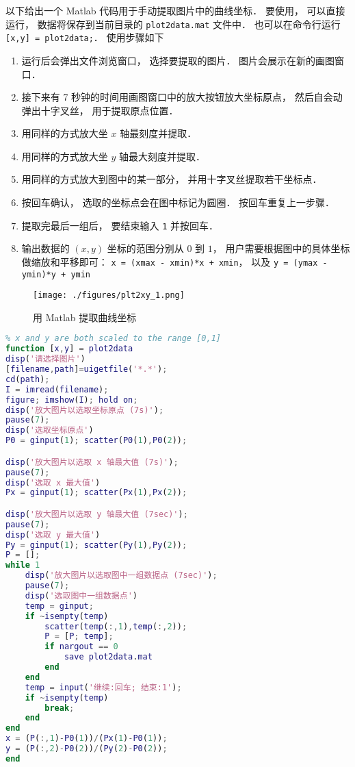 

以下给出一个 Matlab 代码用于手动提取图片中的曲线坐标． 要使用， 可以直接运行， 数据将保存到当前目录的 \verb|plot2data.mat| 文件中． 也可以在命令行运行 \verb|[x,y] = plot2data;|． 使用步骤如下

\begin{enumerate}
\item 运行后会弹出文件浏览窗口， 选择要提取的图片． 图片会展示在新的画图窗口．
\item 接下来有 7 秒钟的时间用画图窗口中的放大按钮放大坐标原点， 然后自会动弹出十字叉丝， 用于提取原点位置．
\item 用同样的方式放大坐 $x$ 轴最刻度并提取．
\item 用同样的方式放大坐 $y$ 轴最大刻度并提取．
\item 用同样的方式放大到图中的某一部分， 并用十字叉丝提取若干坐标点．
\item 按回车确认， 选取的坐标点会在图中标记为圆圈． 按回车重复上一步骤．
\item 提取完最后一组后， 要结束输入 \verb|1| 并按回车．
\item 输出数据的 $(x, y)$ 坐标的范围分别从 $0$ 到 $1$， 用户需要根据图中的具体坐标做缩放和平移即可： \verb|x = (xmax - xmin)*x + xmin|， 以及 \verb|y = (ymax - ymin)*y + ymin|
\end{enumerate}

\begin{figure}[ht]
\centering
\texttt{[image: ./figures/plt2xy\_1.png]}
\caption{用 Matlab 提取曲线坐标} \label{plt2xy_fig1}
\end{figure}

\begin{lstlisting}[language=matlab, caption=plot2data.m]
% Data Extractor for Plot
% x and y are both scaled to the range [0,1]
function [x,y] = plot2data
disp('请选择图片')
[filename,path]=uigetfile('*.*');
cd(path);
I = imread(filename);
figure; imshow(I); hold on;
disp('放大图片以选取坐标原点 (7s)');
pause(7);
disp('选取坐标原点')
P0 = ginput(1); scatter(P0(1),P0(2));

disp('放大图片以选取 x 轴最大值 (7s)');
pause(7);
disp('选取 x 最大值')
Px = ginput(1); scatter(Px(1),Px(2));

disp('放大图片以选取 y 轴最大值 (7sec)');
pause(7);
disp('选取 y 最大值')
Py = ginput(1); scatter(Py(1),Py(2));
P = [];
while 1
    disp('放大图片以选取图中一组数据点 (7sec)');
    pause(7);
    disp('选取图中一组数据点')
    temp = ginput;
    if ~isempty(temp)
        scatter(temp(:,1),temp(:,2));
        P = [P; temp];
        if nargout == 0
            save plot2data.mat
        end
    end
    temp = input('继续:回车; 结束:1');
    if ~isempty(temp)
        break;
    end
end
x = (P(:,1)-P0(1))/(Px(1)-P0(1));
y = (P(:,2)-P0(2))/(Py(2)-P0(2));
end
\end{lstlisting}
